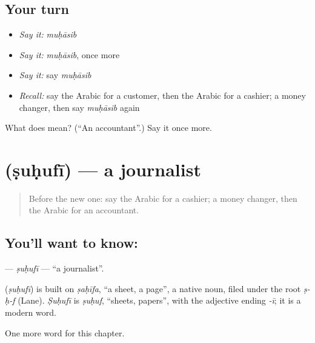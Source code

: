 \subsection*{Your turn}
\begin{itemize}
\raggedright
  \item \emph{Say it:} \emph{muḥāsib}
  \item \emph{Say it:} \emph{muḥāsib}, once more
  \item \emph{Say it:} say \emph{muḥāsib}
  \item \emph{Recall:} say the Arabic for a customer, then the Arabic for a cashier; a money changer, then say \emph{muḥāsib} again
\end{itemize}

\begin{tcolorbox}[breakable,colback=teal!4,colframe=teal!35!black,title={Before you move on}]
What does  mean? (\textquotedblleft{}An accountant\textquotedblright{}.) Say it once more.
\end{tcolorbox}
\section[\texorpdfstring{\ar{صحفي} (ṣuḥufī)}{صحفي (ṣuḥufī)}]{ (ṣuḥufī) — a journalist}

\label{lesson:AR-C189-suhufi}



\begin{quote}
Before the new one: say the Arabic for a cashier; a money changer, then the Arabic for an accountant.
\end{quote}

\subsection*{You'll want to know: }
\textbf{} — \emph{ṣuḥufī} — \textquotedblleft{}a journalist\textquotedblright{}.

\begin{cousinweb}
\textbf{} (\emph{ṣuḥufī}) is built on \emph{ṣaḥīfa}, \textquotedblleft{}a sheet, a page\textquotedblright{}, a native noun, filed under the root \emph{ṣ-ḥ-f} (Lane). \emph{Ṣuḥufī} is \emph{ṣuḥuf}, \textquotedblleft{}sheets, papers\textquotedblright{}, with the adjective ending \emph{-ī}; it is a modern word.
\end{cousinweb}

\begin{grammarlens}[title={What you've built}]
One more word for this chapter.
\end{grammarlens}

